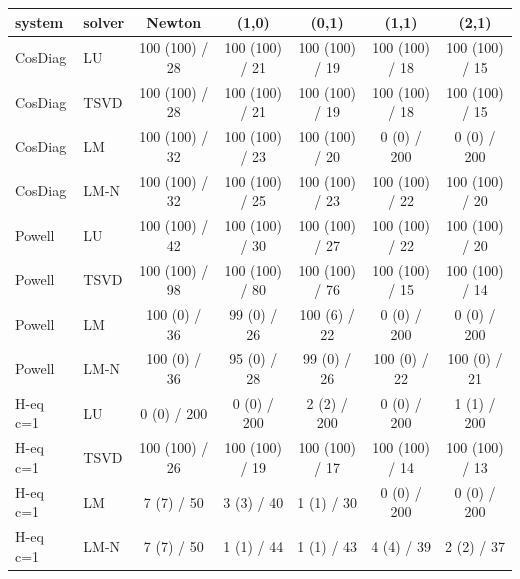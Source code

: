 \begin{tabular}{llccccc}
\toprule
system & solver & Newton & (1,0) & (0,1) & (1,1) & (2,1) \\
\midrule
CosDiag & LU & 100 (100) / 28 & 100 (100) / 21 & 100 (100) / 19 & 100 (100) / 18 & 100 (100) / 15 \\
CosDiag & TSVD & 100 (100) / 28 & 100 (100) / 21 & 100 (100) / 19 & 100 (100) / 18 & 100 (100) / 15 \\
CosDiag & LM & 100 (100) / 32 & 100 (100) / 23 & 100 (100) / 20 & 0 (0) / 200 & 0 (0) / 200 \\
CosDiag & LM-N & 100 (100) / 32 & 100 (100) / 25 & 100 (100) / 23 & 100 (100) / 22 & 100 (100) / 20 \\
Powell & LU & 100 (100) / 42 & 100 (100) / 30 & 100 (100) / 27 & 100 (100) / 22 & 100 (100) / 20 \\
Powell & TSVD & 100 (100) / 98 & 100 (100) / 80 & 100 (100) / 76 & 100 (100) / 15 & 100 (100) / 14 \\
Powell & LM & 100 (0) / 36 & 99 (0) / 26 & 100 (6) / 22 & 0 (0) / 200 & 0 (0) / 200 \\
Powell & LM-N & 100 (0) / 36 & 95 (0) / 28 & 99 (0) / 26 & 100 (0) / 22 & 100 (0) / 21 \\
H-eq c=1 & LU & 0 (0) / 200 & 0 (0) / 200 & 2 (2) / 200 & 0 (0) / 200 & 1 (1) / 200 \\
H-eq c=1 & TSVD & 100 (100) / 26 & 100 (100) / 19 & 100 (100) / 17 & 100 (100) / 14 & 100 (100) / 13 \\
H-eq c=1 & LM & 7 (7) / 50 & 3 (3) / 40 & 1 (1) / 30 & 0 (0) / 200 & 0 (0) / 200 \\
H-eq c=1 & LM-N & 7 (7) / 50 & 1 (1) / 44 & 1 (1) / 43 & 4 (4) / 39 & 2 (2) / 37 \\
\bottomrule
\end{tabular}
